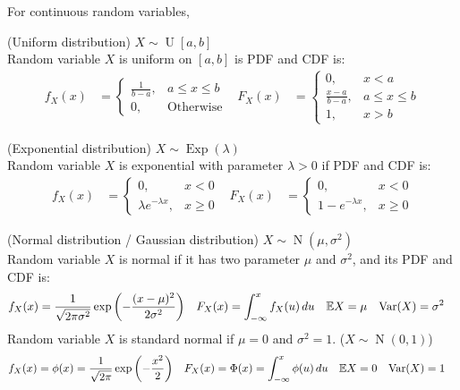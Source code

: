 \documentclass{huhtakm-template-book}
\newcommand{\expect}{\mathbb{E}}
\DeclareMathOperator{\U}{U}
\DeclareMathOperator{\Exp}{Exp}
\DeclareMathOperator{\N}{N}
\DeclareMathOperator{\Var}{Var}
\begin{document}
\newpage
For continuous random variables,
\begin{seg}(Uniform distribution) $X\sim\U[a,b]$\\
    Random variable $X$ is uniform on $[a,b]$ is PDF and CDF is:
    \begin{align*}
        f_{X}(x)&=\begin{cases}
            \frac{1}{b-a}, &a\leq x\leq b\\
            0, &\text{Otherwise}
        \end{cases} & F_{X}(x)&=\begin{cases}
            0, &x<a\\
            \frac{x-a}{b-a}, &a\leq x\leq b\\
            1, &x>b
        \end{cases}
    \end{align*}    
\end{seg}
\begin{seg}(Exponential distribution) $X\sim\Exp(\lambda)$\\
    Random variable $X$ is exponential with parameter $\lambda>0$ if PDF and CDF is:
    \begin{align*}
        f_{X}(x)&=\begin{cases}
            0, &x<0\\
            \lambda e^{-\lambda x}, &x\geq 0
        \end{cases} & F_{X}(x)&=\begin{cases}
            0, &x<0\\
            1-e^{-\lambda x}, &x\geq 0
        \end{cases}
    \end{align*}
\end{seg}
\begin{seg}(Normal distribution / Gaussian distribution) $X\sim\N(\mu,\sigma^{2})$\\
    Random variable $X$ is normal if it has two parameter $\mu$ and $\sigma^{2}$, and its PDF and CDF is:
    \begin{align*}
        f_{X}(x)&=\frac{1}{\sqrt{2\pi\sigma^{2}}}\exp\left(-\frac{(x-\mu)^{2}}{2\sigma^{2}}\right) & F_{X}(x)&=\intlu{-\infty}{x}f_{X}(u)\,du & \expect X&=\mu & \Var(X)&=\sigma^{2}
    \end{align*}
    Random variable $X$ is standard normal if $\mu=0$ and $\sigma^{2}=1$. ($X\sim\N(0,1)$)
    \begin{align*}
        f_{X}(x)&=\phi(x)=\frac{1}{\sqrt{2\pi}}\exp\left(-\frac{x^{2}}{2}\right) & F_{X}(x)&=\Phi(x)=\intlu{-\infty}{x}\phi(u)\,du & \expect X&=0 & \Var(X)&=1
    \end{align*}
\end{seg}
\end{document}
